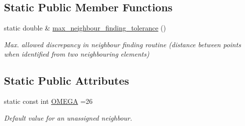 \subsection*{Static Public Member Functions}
\begin{DoxyCompactItemize}
\item 
static double \& \hyperlink{classoomph_1_1Tree_affbae3271da943dfc23645ade966aef9}{max\+\_\+neighbour\+\_\+finding\+\_\+tolerance} ()
\begin{DoxyCompactList}\small\item\em Max. allowed discrepancy in neighbour finding routine (distance between points when identified from two neighbouring elements) \end{DoxyCompactList}\end{DoxyCompactItemize}
\subsection*{Static Public Attributes}
\begin{DoxyCompactItemize}
\item 
static const int \hyperlink{classoomph_1_1Tree_a9e532196340dcd859ff8207eea2ddbbc}{O\+M\+E\+GA} =26
\begin{DoxyCompactList}\small\item\em Default value for an unassigned neighbour. \end{DoxyCompactList}\end{DoxyCompactItemize}
